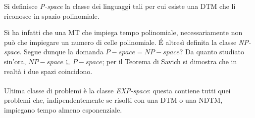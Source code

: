 \documentclass{subfiles}
\begin{document}
\begin{Definition*}
    Si definisce \emph{P-space} la classe dei linguaggi tali per cui esiste una DTM che li riconosce in spazio polinomiale.
\end{Definition*}

\noindent Si ha infatti che una MT che impiega tempo polinomiale, necessariamente non può che impiegare un numero di celle polinomiale.
\'E altresì definita la classe \emph{NP-space}. Segue dunque la domanda \(P-space = NP-space\)?
Da quanto studiato sin'ora, \(NP-space \subseteq P-space\); per il Teorema di Savich si dimostra che in realtà i due spazi coincidono.
\\ \\
Ultima classe di problemi è la classe \emph{EXP-space}: questa contiene tutti quei problemi che, indipendentemente se risolti con una DTM o una NDTM,
impiegano tempo almeno esponenziale.
\end{document}
